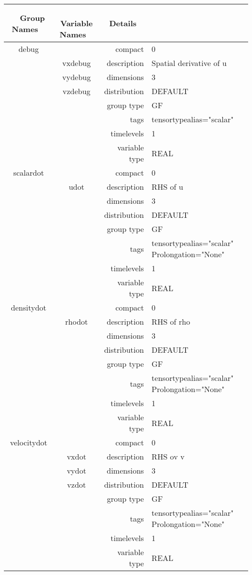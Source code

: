 \documentclass{article}
\begin{document}
\begin{tabular*}{150mm}{|c|c@{\extracolsep{\fill}}|rl|} \hline 
~ {\bf Group Names} ~ & ~ {\bf Variable Names} ~  &{\bf Details} ~ & ~ \\ 
\hline 
debug &  & compact & 0 \\ 
 & vxdebug & description & Spatial derivative of u \\ 
 & vydebug & dimensions & 3 \\ 
 & vzdebug & distribution & DEFAULT \\ 
 &  & group type & GF \\ 
 &  & tags & tensortypealias="scalar" \\ 
 &  & timelevels & 1 \\ 
 &  & variable type & REAL \\ 
\hline 
scalardot &  & compact & 0 \\ 
 & udot & description & RHS of u \\ 
 &  & dimensions & 3 \\ 
 &  & distribution & DEFAULT \\ 
 &  & group type & GF \\ 
 &  & tags & tensortypealias="scalar" Prolongation="None" \\ 
 &  & timelevels & 1 \\ 
 &  & variable type & REAL \\ 
\hline 
densitydot &  & compact & 0 \\ 
 & rhodot & description & RHS of rho \\ 
 &  & dimensions & 3 \\ 
 &  & distribution & DEFAULT \\ 
 &  & group type & GF \\ 
 &  & tags & tensortypealias="scalar" Prolongation="None" \\ 
 &  & timelevels & 1 \\ 
 &  & variable type & REAL \\ 
\hline 
velocitydot &  & compact & 0 \\ 
 & vxdot & description & RHS ov v \\ 
 & vydot & dimensions & 3 \\ 
 & vzdot & distribution & DEFAULT \\ 
 &  & group type & GF \\ 
 &  & tags & tensortypealias="scalar" Prolongation="None" \\ 
 &  & timelevels & 1 \\ 
 &  & variable type & REAL \\ 

\end{tabular*}
\end{document}
